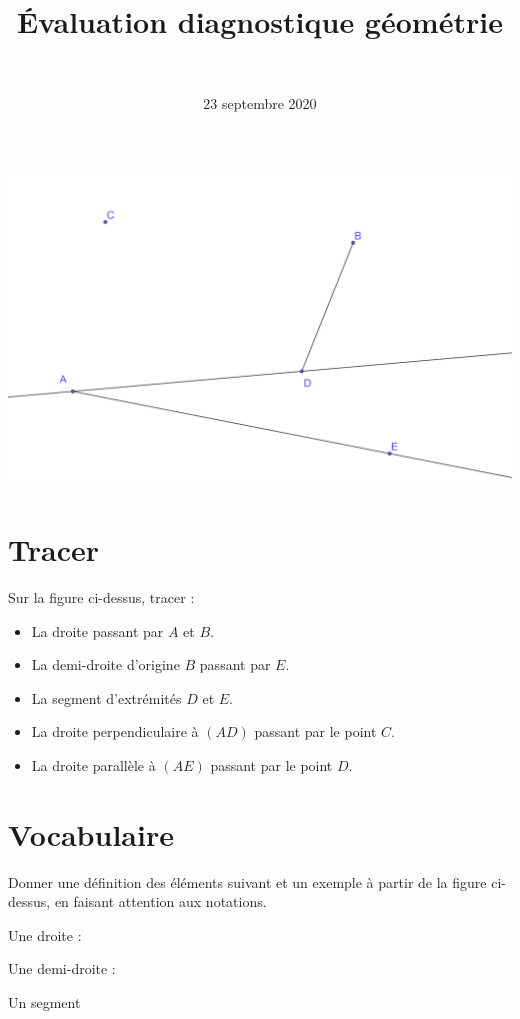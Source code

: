 \documentclass[a4paper,12pt]{exam}
\author{\ }
\date{23 septembre 2020}
\title{\'Evaluation diagnostique géométrie}
\begin{document}
%	

\maketitle


\begin{center}
	\includegraphics*[scale=0.55]{figure}
\end{center}

\section{Tracer}

Sur la figure ci-dessus, tracer :

\begin{itemize}
	\item La droite passant par $A$ et $B$.
	\item La demi-droite d'origine $B$ passant par $E$.
	\item La segment d'extrémités $D$ et $E$.
	\item La droite perpendiculaire à $(AD)$ passant par le point $C$. 
	\item La droite parallèle à $(AE)$ passant par le point $D$.
\end{itemize}

\newpage

\section{Vocabulaire}

Donner une définition des éléments suivant et un exemple à partir de la figure ci-dessus, en faisant attention aux notations.

\begin{questions}
	
	
	\question Une droite :
	
	\fillwithdottedlines{4cm}
	
	\question Une demi-droite :
	
	\fillwithdottedlines{4cm}
	
	\question Un segment  
	
	\fillwithdottedlines{4cm}
\end{questions}





\label{LastPage}
\end{document}
